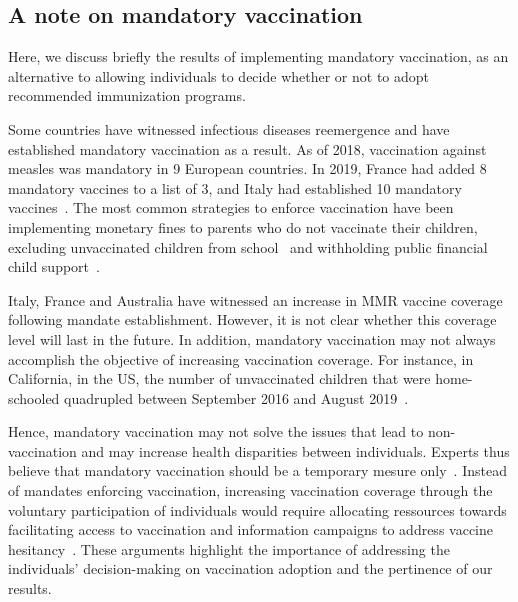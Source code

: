 
\subsection{A note on mandatory vaccination}

Here, we discuss briefly the results of implementing mandatory vaccination, as an alternative to allowing individuals to decide whether or not to adopt recommended immunization programs.

Some countries have witnessed infectious diseases reemergence and have established mandatory vaccination as a result. As of 2018, vaccination against measles was mandatory in 9 European countries. In 2019, France had added 8 mandatory vaccines to a list of 3, and Italy had established 10 mandatory vaccines~\cite[]{Bechini2019}. The most common strategies to enforce vaccination have been implementing monetary fines to parents who do not vaccinate their children, excluding unvaccinated children from school~\cite[]{Drew2019,Bechini2019} and withholding public financial child support~\cite[]{Drew2019,Australia2015}.

Italy, France and Australia have witnessed an increase in MMR vaccine coverage following mandate establishment. However, it is not clear whether this coverage level will last in the future. In addition, mandatory vaccination may not always accomplish the objective of increasing vaccination coverage. For instance, in California, in the US, the number of unvaccinated children that were home-schooled quadrupled between September 2016 and August 2019~\cite[]{Drew2019}. 

Hence, mandatory vaccination may not solve the issues that lead to non-vaccination and may increase health disparities between individuals. Experts thus believe that mandatory vaccination should be a temporary mesure only~\cite[]{Bechini2019}. Instead of mandates enforcing vaccination, increasing vaccination coverage through the voluntary participation of individuals would require allocating ressources towards facilitating access to vaccination and information campaigns to address vaccine hesitancy~\cite[]{Drew2019,Bechini2019}. These arguments highlight the importance of addressing the individuals' decision-making on vaccination adoption and the pertinence of our results.